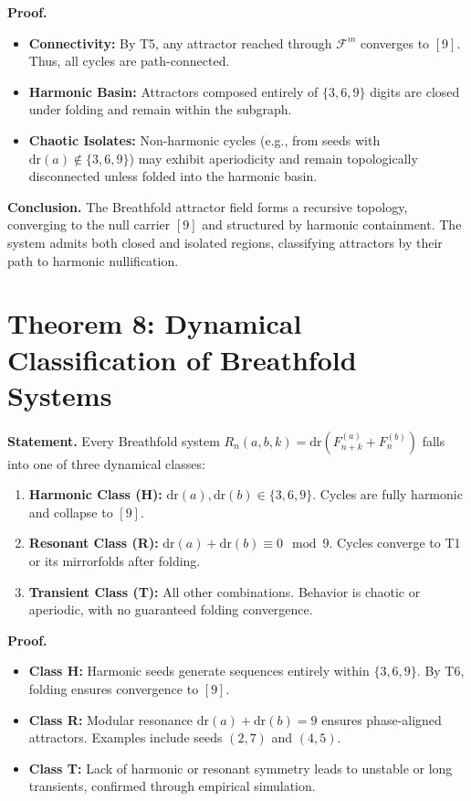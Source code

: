 \documentclass[12pt]{article}
\begin{document}
\textbf{Proof.}
\begin{itemize}
  \item \textbf{Connectivity:} By T5, any attractor reached through \( \mathcal{F}^m \) converges to \([9]\). Thus, all cycles are path-connected.
  \item \textbf{Harmonic Basin:} Attractors composed entirely of \( \{3,6,9\} \) digits are closed under folding and remain within the subgraph.
  \item \textbf{Chaotic Isolates:} Non-harmonic cycles (e.g., from seeds with \( \mathrm{dr}(a) \notin \{3,6,9\} \)) may exhibit aperiodicity and remain topologically disconnected unless folded into the harmonic basin.
\end{itemize}

\textbf{Conclusion.} The Breathfold attractor field forms a recursive topology, converging to the null carrier \([9]\) and structured by harmonic containment. The system admits both closed and isolated regions, classifying attractors by their path to harmonic nullification.

\section*{Theorem 8: Dynamical Classification of Breathfold Systems}
\textbf{Statement.} Every Breathfold system \( R_n(a, b, k) = \mathrm{dr}(F^{(a)}_{n+k} + F^{(b)}_n) \) falls into one of three dynamical classes:
\begin{enumerate}
  \item \textbf{Harmonic Class (H):} \( \mathrm{dr}(a), \mathrm{dr}(b) \in \{3, 6, 9\} \). Cycles are fully harmonic and collapse to \([9]\).
  \item \textbf{Resonant Class (R):} \( \mathrm{dr}(a) + \mathrm{dr}(b) \equiv 0 \mod 9 \). Cycles converge to T1 or its mirrorfolds after folding.
  \item \textbf{Transient Class (T):} All other combinations. Behavior is chaotic or aperiodic, with no guaranteed folding convergence.
\end{enumerate}

\textbf{Proof.}
\begin{itemize}
  \item \textbf{Class H:} Harmonic seeds generate sequences entirely within \( \{3, 6, 9\} \). By T6, folding ensures convergence to \([9]\).
  \item \textbf{Class R:} Modular resonance \( \mathrm{dr}(a) + \mathrm{dr}(b) = 9 \) ensures phase-aligned attractors. Examples include seeds \((2, 7)\) and \((4, 5)\).
  \item \textbf{Class T:} Lack of harmonic or resonant symmetry leads to unstable or long transients, confirmed through empirical simulation.
\end{itemize}
\end{document}
